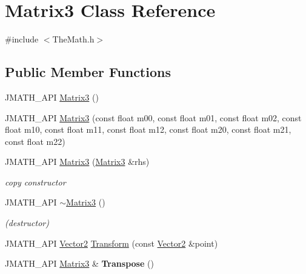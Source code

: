 \hypertarget{class_matrix3}{\section{Matrix3 Class Reference}
\label{class_matrix3}
}


{\ttfamily \#include $<$The\+Math.\+h$>$}

\subsection*{Public Member Functions}
\begin{DoxyCompactItemize}
\item 
J\+M\+A\+T\+H\+\_\+\+A\+P\+I \hyperlink{class_matrix3_a773fdcf139826ddb39c30e7d08bbdb90}{Matrix3} ()
\item 
J\+M\+A\+T\+H\+\_\+\+A\+P\+I \hyperlink{class_matrix3_aba0c8d7a55fede74ad435dd22437300d}{Matrix3} (const float m00, const float m01, const float m02, const float m10, const float m11, const float m12, const float m20, const float m21, const float m22)
\item 
\hypertarget{class_matrix3_a5e613dbfd5a8d3184fe8d37ec34d82da}{J\+M\+A\+T\+H\+\_\+\+A\+P\+I \hyperlink{class_matrix3_a5e613dbfd5a8d3184fe8d37ec34d82da}{Matrix3} (\hyperlink{class_matrix3}{Matrix3} \&rhs)}\label{class_matrix3_a5e613dbfd5a8d3184fe8d37ec34d82da}

\begin{DoxyCompactList}\small\item\em copy constructor \end{DoxyCompactList}\item 
\hypertarget{class_matrix3_af6deed330508914859e5262280d553f6}{J\+M\+A\+T\+H\+\_\+\+A\+P\+I \hyperlink{class_matrix3_af6deed330508914859e5262280d553f6}{$\sim$\+Matrix3} ()}\label{class_matrix3_af6deed330508914859e5262280d553f6}

\begin{DoxyCompactList}\small\item\em (destructor) \end{DoxyCompactList}\item 
J\+M\+A\+T\+H\+\_\+\+A\+P\+I \hyperlink{class_vector2}{Vector2} \hyperlink{class_matrix3_a7795d54a9162638ab82fa06fd3b607bc}{Transform} (const \hyperlink{class_vector2}{Vector2} \&point)
\item 
\hypertarget{class_matrix3_ad29744bcc979f186edb1e76590a28ea8}{J\+M\+A\+T\+H\+\_\+\+A\+P\+I \hyperlink{class_matrix3}{Matrix3} \& {\bfseries Transpose} ()}\label{class_matrix3_ad29744bcc979f186edb1e76590a28ea8}


\end{DoxyCompactItemize}
